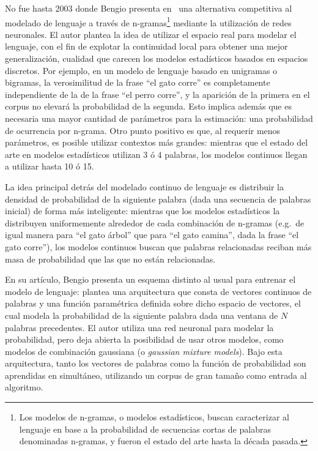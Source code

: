 No fue hasta 2003 donde Bengio presenta en~\cite{Bengio2003} una alternativa competitiva al modelado
de lenguaje a través de n-gramas\footnote{Los modelos de n-gramas, o modelos estadísticos, buscan
caracterizar al lenguaje en base a la probabilidad de secuencias cortas de palabras denominadas
n-gramas, y fueron el estado del arte hasta la década pasada.} mediante la utilización de redes
neuronales. El autor plantea la idea de utilizar el espacio real para modelar el lenguaje, con el
fin de explotar la continuidad local para obtener una mejor generalización, cualidad que carecen los
modelos estadísticos basados en espacios discretos. Por ejemplo, en un modelo de lenguaje basado en
unigramas o bigramas, la verosimilitud de la frase ``el gato corre'' es completamente independiente
de la de la frase ``el perro corre'', y la aparición de la primera en el corpus no elevará la
probabilidad de la segunda. Esto implica además que es necesaria una mayor cantidad de parámetros
para la estimación: una probabilidad de ocurrencia por n-grama. Otro punto positivo es que, al
requerir menos parámetros, es posible utilizar contextos más grandes: mientras que el estado del
arte en modelos estadísticos utilizan 3 ó 4 palabras, los modelos continuos llegan a utilizar hasta
10 ó 15.

La idea principal detrás del modelado continuo de lenguaje es distribuir la densidad de probabilidad de
la siguiente palabra (dada una secuencia de palabras inicial) de forma más inteligente: mientras que
los modelos estadísticos la distribuyen uniformemente alrededor de cada combinación de n-gramas
(e.g.\ de igual manera para ``el gato árbol'' que para ``el gato camina'', dada la frase ``el gato
corre''), los modelos continuos buscan que palabras relacionadas reciban más masa de probabilidad
que las que no están relacionadas.

En su artículo, Bengio presenta un esquema distinto al usual para entrenar el modelo de lenguaje:
plantea una arquitectura que consta de vectores continuos de palabras y una función paramétrica
definida sobre dicho espacio de vectores, el cual modela la probabilidad de la siguiente palabra
dada una ventana de $N$ palabras precedentes. El autor utiliza una red neuronal para modelar la
probabilidad, pero deja abierta la posibilidad de usar otros modelos, como modelos de combinación gaussiana
(o \textit{gaussian mixture models}). Bajo esta arquitectura, tanto los vectores de palabras como la
función de probabilidad son aprendidas en simultáneo, utilizando un corpus de gran tamaño como
entrada al algoritmo.

